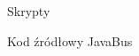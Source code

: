\begin{easyappendix}{Skrypty}
    \label{apx:ttest_plot}
\end{easyappendix}

\begin{easyappendix}{Kod źródłowy JavaBus}

\end{easyappendix}